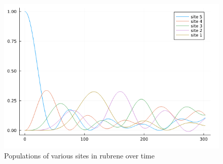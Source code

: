 \begin{figure}[h]
    \centering
    \includegraphics[scale=0.4]{Figures/rubrene_result.png}
    \caption{Populations of various sites in rubrene over time}
\end{figure}






